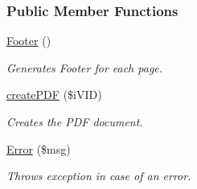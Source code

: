 \subsubsection*{Public Member Functions}
\begin{DoxyCompactItemize}
\item 
\hyperlink{classoverview_p_d_f_a2f39533ba0786237090683635ef01c49}{Footer} ()
\begin{DoxyCompactList}\small\item\em Generates Footer for each page. \end{DoxyCompactList}\item 
\hyperlink{classoverview_p_d_f_a30ddd92aaf87bca0825c149bd3a7d43f}{create\+P\+D\+F} (\$i\+V\+I\+D)
\begin{DoxyCompactList}\small\item\em Creates the P\+D\+F document. \end{DoxyCompactList}\item 
\hyperlink{classoverview_p_d_f_a5afab85a7aaf19395f9a0e86cae76928}{Error} (\$msg)
\begin{DoxyCompactList}\small\item\em Throws exception in case of an error. \end{DoxyCompactList}\end{DoxyCompactItemize}
